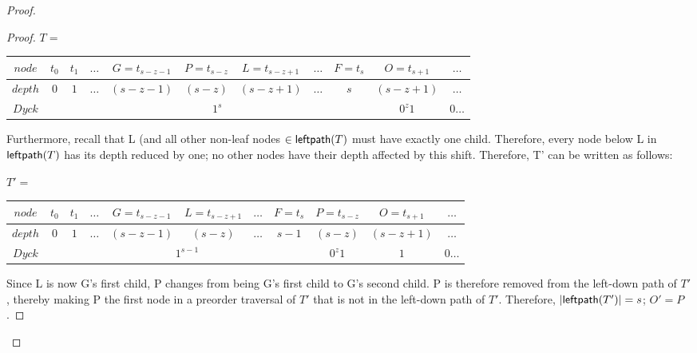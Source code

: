 \begin{proof}
\begin{proof}
    \bigskip
    \bigskip

    $T=$
    \begin{center}
	\begin{tabular}{ |c|c|c|c|c|c|c|c|c|c|c| } 
	    \hline

	    $node$ & $t_0$ & $t_1$ & $\dots$ & $G=t_{s-z-1}$ & $P=t_{s-z}$ & $L=t_{s-z+1}$ & $\dots$ & $F=t_s$ & $O=t_{s+1}$ & $\dots$ \\
	    \hline
	    $depth$ & $0$ & $1$ & $\dots$ & $(s-z-1)$ & $(s-z)$ & $(s-z+1)$ & $\dots$ & $s$  & $(s-z+1)$ & $\dots$\\
	    \hline
	    $Dyck$ &  &  \multicolumn{7}{|c|}{$1^s$} &  $0^{z}1$   & $0\dots$\\
	    \hline
	\end{tabular}
    \end{center}

    Furthermore, recall that L (and all other non-leaf nodes $\in \mathsf{leftpath}{(T)}$ must have exactly one child.  Therefore, every node below L in $\mathsf{leftpath}{(T)}$ has its depth reduced by one; no other nodes have their depth affected by this shift. Therefore, T' can be written as follows:

    \bigskip


    $T'=$
    \begin{center}
	\begin{tabular}{ |c|c|c|c|c|c|c|c|c|c|c| } 
	    \hline

	    $node$ & $t_0$ & $t_1$ & $\dots$ & $G=t_{s-z-1}$ & $L=t_{s-z+1}$ & $\dots$ & $F=t_s$ & $P=t_{s-z}$ & $O=t_{s+1}$ & $\dots$ \\
	    \hline
	    $depth$ & $0$ & $1$ & $\dots$ & $(s-z-1)$ & $(s-z)$ & $\dots$ & $s-1$ & $(s-z)$  & $(s-z+1)$ & $\dots$\\
	    \hline
	    $Dyck$ &  &  \multicolumn{6}{|c|}{$1^{s-1}$} &  $0^{z}1$   & $1$ & $0\dots$\\
	    \hline
	\end{tabular}
    \end{center}

    Since L is now G's first child, P changes from being G's first child to G's second child.  P is therefore removed from the left-down path of $T'$, thereby making P the first node in a preorder traversal of $T'$ that is not in the left-down path of $T'$.  
    Therefore, $|\mathsf{leftpath}{(T')}|=s$; $O'=P$. %



\end{proof}
\end{proof}
